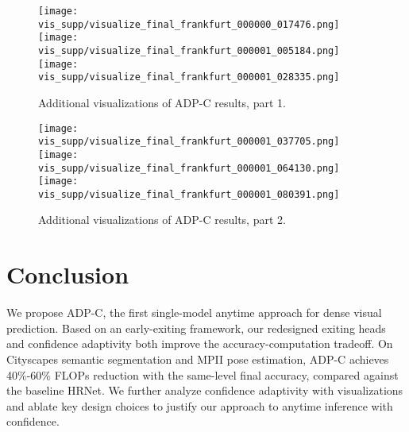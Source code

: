\begin{figure}[!htbp]
\texttt{[image: vis\_supp/visualize\_final\_frankfurt\_000000\_017476.png]}
\texttt{[image: vis\_supp/visualize\_final\_frankfurt\_000001\_005184.png]}
\texttt{[image: vis\_supp/visualize\_final\_frankfurt\_000001\_028335.png]}
\caption{%
Additional visualizations of ADP-C results, part 1.
}
\label{fig:vis1}
\end{figure}

\begin{figure}[!htbp]
\texttt{[image: vis\_supp/visualize\_final\_frankfurt\_000001\_037705.png]}
\texttt{[image: vis\_supp/visualize\_final\_frankfurt\_000001\_064130.png]}
\texttt{[image: vis\_supp/visualize\_final\_frankfurt\_000001\_080391.png]}
\caption{%
Additional visualizations of ADP-C results, part 2.
}
\label{fig:vis2}
\end{figure}


\section{Conclusion}
We propose ADP-C, the first single-model anytime approach for dense visual prediction.
Based on an early-exiting framework, our redesigned exiting heads and confidence adaptivity both improve the accuracy-computation tradeoff.
On Cityscapes semantic segmentation and MPII pose estimation, ADP-C achieves 40\%-60\% FLOPs reduction with the same-level final accuracy, compared against the baseline HRNet.
We further analyze confidence adaptivity with visualizations and ablate key design choices to justify our approach to anytime inference with confidence.